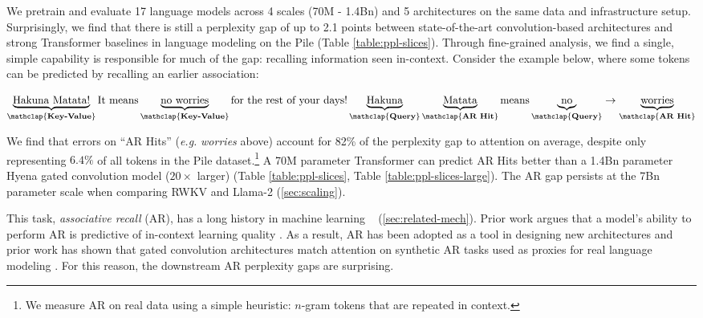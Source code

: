 We pretrain and evaluate 17 language models across 4 scales (70M - 1.4Bn) and 5 architectures on the same data and infrastructure setup. Surprisingly, we find that there is still a perplexity gap of up to 2.1 points between state-of-the-art convolution-based architectures and strong Transformer baselines in language modeling on the Pile (Table \ref{table:ppl-slices}). Through fine-grained analysis, we find a single, simple capability is responsible for much of the gap: recalling information seen in-context. Consider the example below, where some tokens can be predicted by recalling an earlier association:

$$
\underbrace{\text{Hakuna Matata!}}_{\mathclap{\textbf{Key-Value}}} \text{It means} \underbrace{\text{no  worries}}_{\mathclap{\textbf{Key-Value}}} \text{for the rest of your days!} \underbrace{\text{Hakuna}}_{\mathclap{\textbf{Query}}} \underbrace{\text{Matata}}_{\mathclap{\textbf{AR Hit}}}
\text{means} \underbrace{\text{no}}_{\mathclap{\textbf{Query}}} \rightarrow \underbrace{\text{worries}}_{\mathclap{\textbf{AR Hit}}} $$

We find that errors on ``AR Hits'' (\textit{e.g.} \textit{worries} above) account for 82\% of the perplexity gap to attention on average, despite only representing $6.4\%$ of all tokens in the Pile dataset.\footnote{We measure AR on real data using a simple heuristic: $n$-gram tokens that are repeated in context. } A 70M parameter Transformer can predict AR Hits better than a 1.4Bn parameter Hyena gated convolution model ($20\times$ larger) (Table \ref{table:ppl-slices}, Table \ref{table:ppl-slices-large}). The AR gap persists at the 7Bn parameter scale when comparing RWKV and Llama-2 (\ref{sec:scaling}). 

This task, \textit{associative recall} (AR), has  a long history in machine learning  ~\cite[inter alia.]{graves2014neural,ba2016using} (\ref{sec:related-mech}). 
Prior work argues that a model's ability to perform AR is predictive of in-context learning quality \citep{elhage2021mathematical, olsson2022context}. As a result, AR has been adopted as a tool in designing new  architectures and prior work has shown that gated convolution architectures match attention on synthetic AR tasks used as proxies for real language modeling \citep{dao2022hungry, poli2023hyena, lutati2023focus}. For this reason, the downstream AR perplexity gaps are surprising. 

